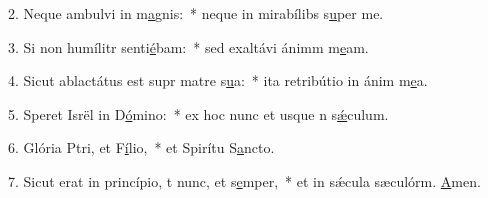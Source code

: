 2. Neque ambulvi in m\uline{a}gnis:~* neque in mirabílibs s\uline{u}per me.\par 
3. Si non humílitr senti\uline{é}bam:~* sed exaltávi ánimm m\uline{e}am.\par 
4. Sicut ablactátus est supr matre s\uline{u}a:~* ita retribútio in ánim m\uline{e}a.\par 
5. Speret Isrël in D\uline{ó}mino:~* ex hoc nunc et usque n s\uline{ǽ}culum.\par 
6. Glória Ptri, et F\uline{í}lio,~* et Spirítu S\uline{a}ncto.\par 
7. Sicut erat in princípio, t nunc, et s\uline{e}mper,~* et in sǽcula sæculórm. \uline{A}men.\par 
